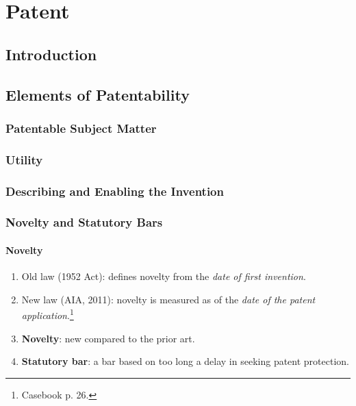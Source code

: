 \section{Patent}

\subsection{Introduction}


\subsection{Elements of Patentability}

\subsubsection{Patentable Subject Matter}





\subsubsection{Utility}


\subsubsection{Describing and Enabling the Invention}




\subsubsection{Novelty and Statutory Bars}

\paragraph{Novelty}

\begin{enumerate}
    \item Old law (1952 Act): defines novelty from the \emph{date of first 
    invention}.
    \item New law (AIA, 2011): novelty is measured as of the \emph{date of the 
    patent application}.\footnote{Casebook p. 26.}
    \item \textbf{Novelty}: new compared to the prior art.
    \item \textbf{Statutory bar}: a bar based on too long a delay in seeking 
    patent protection.
\end{enumerate}


